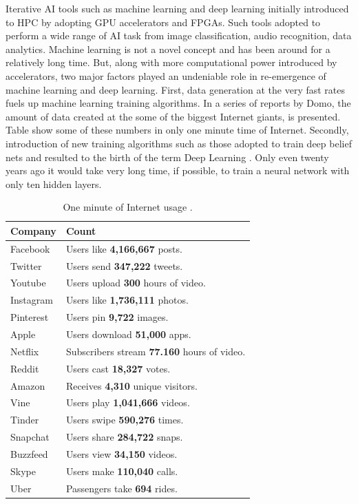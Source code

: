 \documentclass[runningheads,a4paper]{llncs}
\begin{document}
Iterative AI tools such as machine learning and deep learning initially introduced to HPC by adopting GPU accelerators and FPGAs. Such tools adopted to perform a wide range of AI task from image classification, audio recognition, data analytics. Machine learning is not a novel concept and has been around for a relatively long time. But, along with more computational power introduced by accelerators, two major factors played an undeniable role in re-emergence of machine learning and deep learning. First, data generation at the very fast rates fuels up machine learning training algorithms. In a series of reports by Domo, \cite{domo} the amount of data created at the some of the biggest Internet giants, is presented. Table show some of these numbers in only one minute time of Internet. Secondly, introduction of new training algorithms such as those adopted to train deep belief nets and resulted to the birth of the term Deep Learning \cite{hinton2006fast}. Only even twenty years ago it would take very long time, if possible, to train a neural network with only ten hidden layers.
\begin{table}
	\centering
	\caption{One minute of Internet usage \cite{domo}.}
	\begin{tabular}{ |p{3cm}|p{9cm}|  }
		\hline
		Company & Count \\
		\hline
		Facebook & Users like \textbf{4,166,667} posts.\\
		\hline
		Twitter & Users send \textbf{347,222} tweets.\\
		\hline
		Youtube & Users upload \textbf{300} hours of video.\\
		\hline
		Instagram & Users like \textbf{1,736,111} photos. \\
		\hline
		Pinterest & Users pin \textbf{9,722} images.\\
		\hline
		Apple & Users download  \textbf{51,000} apps.\\
		\hline
		Netflix & Subscribers stream  \textbf{77.160} hours of video.\\
		\hline
		Reddit & Users cast  \textbf{18,327} votes.\\
		\hline
		Amazon & Receives  \textbf{4,310} unique visitors.\\
		\hline
		Vine & Users play  \textbf{1,041,666} videos.\\
		\hline
		Tinder & Users swipe  \textbf{590,276} times.\\
		\hline
		Snapchat & Users share  \textbf{284,722} snaps.\\
		\hline
		Buzzfeed & Users view  \textbf{34,150} videos.\\
		\hline
		Skype & Users make  \textbf{110,040} calls.\\
		\hline
		Uber & Passengers take  \textbf{694} rides.\\
		\hline
		
	\end{tabular}
	\label{table:Domo}
\end{table}
\end{document}
